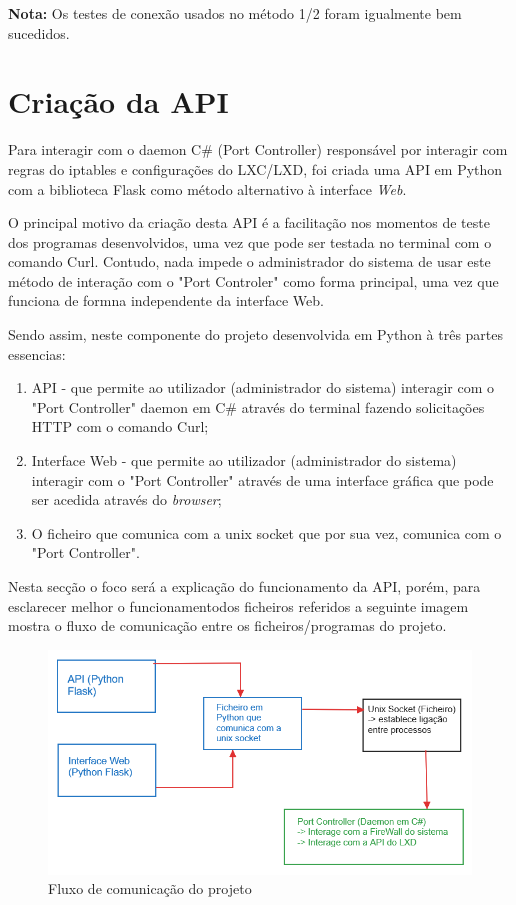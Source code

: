 \textbf{Nota:} Os testes de conexão usados no método 1/2 foram igualmente bem sucedidos.




\section{Criação da API}

Para interagir com o daemon C\# (Port Controller) responsável por interagir com regras do iptables
e configurações do LXC/LXD, foi criada uma API em Python com a biblioteca Flask como
método alternativo à interface \textit{Web}.

O principal motivo da criação desta API é a facilitação nos momentos de teste dos programas
desenvolvidos, uma vez que pode ser testada no terminal com o comando Curl. Contudo, nada 
impede o administrador do sistema de usar este método de interação com o "Port Controler"
como forma principal, uma vez que funciona de formna independente da interface Web.

Sendo assim, neste componente do projeto desenvolvida em Python à três partes essencias:

\begin{enumerate}
    \item API - que permite ao utilizador (administrador do sistema) interagir com o "Port Controller" daemon em C\#
    através do terminal fazendo solicitações HTTP com o comando Curl;
    \item Interface Web - que permite ao utilizador (administrador do sistema) interagir com o "Port Controller"
    através de uma interface gráfica que pode ser acedida através do \textit{browser};
    \item O ficheiro que comunica com a unix socket que por sua vez, comunica com o "Port Controller". 
\end{enumerate}

Nesta secção o foco será a explicação do funcionamento da API, porém, para esclarecer
melhor o funcionamentodos ficheiros referidos a seguinte imagem mostra o fluxo de comunicação
entre os ficheiros/programas do projeto.

\begin{figure}[H]
\begin{center}
\includegraphics[width=14cm]{figs/fluxo de comunicação.png}
\caption{Fluxo de comunicação do projeto}
\label{fig:bookstack}
\end{center}
\end{figure}

